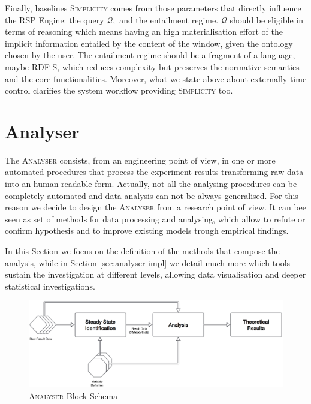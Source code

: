 Finally, baselines \textsc{Simplicity} comes from those parameters that directly influence the RSP Engine: the query $\mathcal{Q},$ and the entailment regime. $\mathcal{Q}$ should be eligible in terms of reasoning which means having an high materialisation effort of the implicit information entailed by the content of the window, given the ontology chosen by the user. The entailment regime should be a fragment of a language, maybe RDF-S, which reduces complexity but preserves the normative semantics and the core functionalities. Moreover, what we state above about externally time control clarifies the system workflow providing \textsc{Simplicity} too.

\section{Analyser}\label{sec:analyser}

The \textsc{Analyser} consists, from an engineering point of view, in one or more automated procedures that process the experiment results transforming raw data into an human-readable form. Actually, not all the analysing procedures can be completely automated and data analysis can not be always generalised. For this reason we decide to design the \textsc{Analyser} from a research point of view. It can bee seen as set of methods for data processing and analysing, which allow to refute or confirm hypothesis and to improve existing models trough empirical findings.

In this Section we focus on the definition of the methods that compose the analysis, while in Section \ref{sec:analyser-impl} we detail much more which tools sustain the investigation at different levels, allowing data visualisation and deeper statistical investigations.

\begin{figure}[tbh]
  \centering
	\includegraphics[width=\linewidth]{images/analyser-block-schema}
	\caption{\textsc{Analyser} Block Schema} 
  	\label{fig:analyser-block-schema}
\end{figure}

